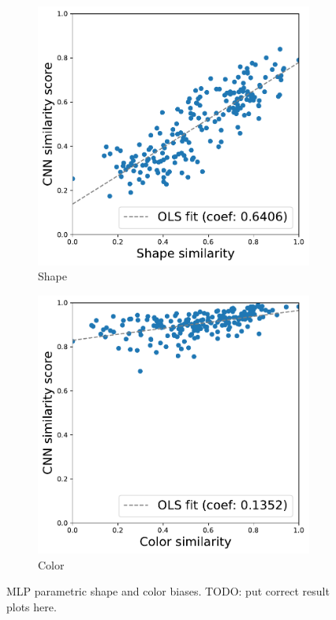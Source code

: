 \begin{figure}[h!]
    \begin{center}
        \begin{subfigure}[b]{0.235\textwidth}
            \includegraphics[width=\linewidth]
            {figures/vgg_shape_parametric_others_constant.pdf}
            \caption{Shape}
        \end{subfigure}
        \begin{subfigure}[b]{0.235\textwidth}
            \includegraphics[width=\linewidth]
            {figures/vgg_color_parametric_others_constant.pdf}
            \caption{Color}
        \end{subfigure}
    \end{center}
    \caption{MLP parametric shape and color biases. TODO: put correct result
    plots here.}
    \label{fig:mlp_parametric}
\end{figure}